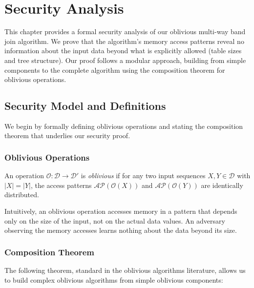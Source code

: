 \chapter{Security Analysis}

This chapter provides a formal security analysis of our oblivious multi-way band join algorithm. We prove that the algorithm's memory access patterns reveal no information about the input data beyond what is explicitly allowed (table sizes and tree structure). Our proof follows a modular approach, building from simple components to the complete algorithm using the composition theorem for oblivious operations.

\section{Security Model and Definitions}

We begin by formally defining oblivious operations and stating the composition theorem that underlies our security proof.

\subsection{Oblivious Operations}

\begin{definition}
An operation $\mathcal{O}: \mathcal{D} \rightarrow \mathcal{D}'$ is \emph{oblivious} if for any two input sequences $X, Y \in \mathcal{D}$ with $|X| = |Y|$, the access patterns $\mathcal{AP}(\mathcal{O}(X))$ and $\mathcal{AP}(\mathcal{O}(Y))$ are identically distributed.
\end{definition}

Intuitively, an oblivious operation accesses memory in a pattern that depends only on the size of the input, not on the actual data values. An adversary observing the memory accesses learns nothing about the data beyond its size.

\subsection{Composition Theorem}

The following theorem, standard in the oblivious algorithms literature, allows us to build complex oblivious algorithms from simple oblivious components:

